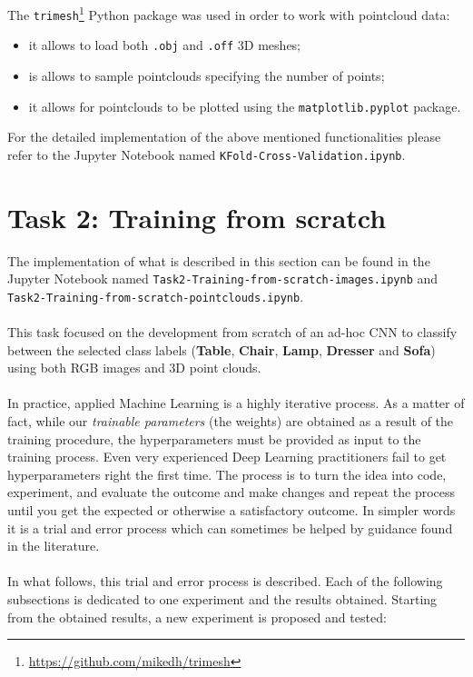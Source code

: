 \documentclass[11pt,a4paper]{article}
\begin{document}
The \texttt{trimesh}\footnote{\url{https://github.com/mikedh/trimesh}} Python package was used in order to work with pointcloud data:
\begin{itemize}
    \item it allows to load both \texttt{.obj} and \texttt{.off} 3D meshes;
    \item is allows to sample pointclouds specifying the number of points;
    \item it allows for pointclouds to be plotted using the \texttt{matplotlib.pyplot} package.
\end{itemize}
For the detailed implementation of the above mentioned functionalities please refer to the Jupyter Notebook named \texttt{KFold-Cross-Validation.ipynb}.

\newpage
\section{Task 2: Training from scratch}
The implementation of what is described in this section can be found in the Jupyter Notebook named \texttt{Task2-Training-from-scratch-images.ipynb} and\\ \texttt{Task2-Training-from-scratch-pointclouds.ipynb}.\\
\\
This task focused on the development from scratch of an ad-hoc CNN to classify between the selected class labels (\textbf{Table}, \textbf{Chair}, \textbf{Lamp}, \textbf{Dresser} and \textbf{Sofa}) using both RGB images and 3D point clouds.\\
\\
In practice, applied Machine Learning is a highly iterative process. As a matter of fact, while our \textit{trainable parameters} (the weights) are obtained as a result of the training procedure, the hyperparameters must be provided as input to the training process. Even very experienced Deep Learning practitioners fail to get hyperparameters right the first time. The process is to turn the idea into code, experiment, and evaluate the outcome and make changes and repeat the process until you get the expected or otherwise a satisfactory outcome. In simpler words it is a trial and error process which can sometimes be helped by guidance found in the literature.\\
\\
In what follows, this trial and error process is described. Each of the following subsections is dedicated to one experiment and the results obtained. Starting from the obtained results, a new experiment is proposed and tested:
\end{document}
